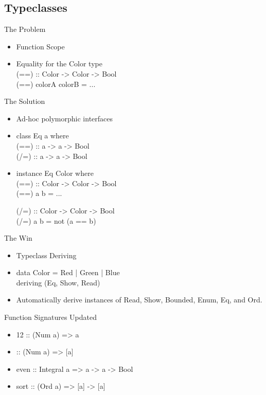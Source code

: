 \documentclass{beamer}                  %
\newcommand{\srule}{
	\rule{\textwidth}{1pt}\\
}
\newlength{\subsecwidth}
\newenvironment{slide}{
	\begin{frame} %
	\settowidth{\subsecwidth}{\insertsubsection} %
	\ifthenelse{\dimtest{\subsecwidth}{<}{1pt}}{ %
		\frametitle{\insertsection\\             %
		\vspace{-1ex}                            %
		\color{fore}\srule                       %
		\par                                     %
		\vspace{-3ex}                            %
		}
	}{                                           %
		\frametitle{\insertsection\ -- \insertsubsection\\ %
		\vspace{-1ex}                            %
		\color{fore}\srule                       %
		\par                                     %
		\vspace{-3ex}                            %
		}
	}
	\Large                                       %
}{
	\end{frame}
}
\begin{document}
\subsection{Typeclasses}
\begin{slide}
  The Problem
  \begin{itemize}
    \item Function Scope
    \item Equality for the Color type\\
      \code
      (==) :: Color -> Color -> Bool\\
      (==) colorA colorB = ...
  \end{itemize}
\end{slide}

\begin{slide}
  The Solution
  \begin{itemize}
    \item Ad-hoc polymorphic interfaces
    \item
      \code
      class Eq a where\\
      (==) :: a -> a -> Bool\\
      (/=) :: a -> a -> Bool
    \item
      \code
      instance Eq Color where\\
        (==) :: Color -> Color -> Bool\\
        (==) a b = ...

        (/=) :: Color -> Color -> Bool\\
        (/=) a b = not (a == b)
  \end{itemize}
\end{slide}

\begin{slide}
  The Win
  \begin{itemize}
    \item Typeclass Deriving
    \item
      \code
      data Color = Red | Green | Blue\\
      deriving (Eq, Show, Read)
    \item Automatically derive instances of Read, Show, Bounded, Enum, Eq, and Ord.
  \end{itemize}
\end{slide}

\begin{slide}
  Function Signatures Updated
  \begin{itemize}
    \item 12 :: (Num a) => a
    \item \code [1,2,3] :: (Num a) => [a]
    \item even :: Integral a => a -> a -> Bool
    \item sort :: (Ord a) => [a] -> [a]
  \end{itemize}
\end{slide}
\end{document}
